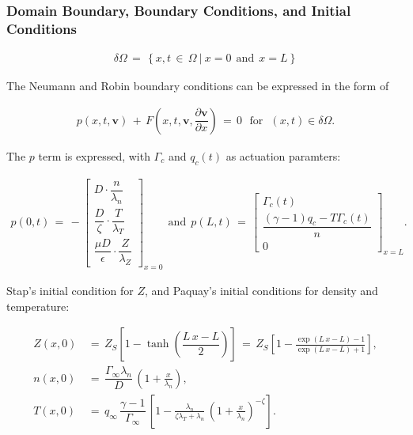 \documentclass[a4paper,10pt]{article}
\begin{document}
\subsubsection{Domain Boundary, Boundary Conditions, and Initial
Conditions}\label{domain-boundary-boundary-conditions-and-initial-conditions}

\begin{align}
    \delta \Omega \,=\, \left\{x, t \,\in\, \Omega ~|~ x = 0 ~~\text{and}~~ x = L\right\}
\end{align}

The Neumann and Robin boundary conditions can be expressed in the form
of

\begin{align}
    p\left(x, t, \mathbf{v}\right) \,+\, F\left(x, t, \mathbf{v}, \dfrac{\partial\mathbf{v}}{\partial x}\right) \,=\, 0 ~~~ \text{for} ~~~ (x, t) \in \delta\Omega.
\end{align}

The \(p\) term is expressed, with \(\Gamma_c\) and \(q_c(t)\) as
actuation paramters:

\begin{align}
p(0, t) \,=\, -\begin{bmatrix}
                D \cdot \dfrac{n}{\lambda_n}\\[2ex]
                \dfrac{D}{\zeta} \cdot \dfrac{T}{\lambda_T} \\[2ex]
                \dfrac{\mu D}{\epsilon} \cdot \dfrac{Z}{\lambda_Z}
                \end{bmatrix}_{x = 0}
~~ \text{and} ~~
p(L, t) \,=\, \begin{bmatrix}
                \Gamma_c(t) \\[1ex]
                \dfrac{(\gamma - 1) q_c - T\Gamma_c(t)}{n} \\[2ex]
                0
                \end{bmatrix}_{x = L}.
\end{align}

Stap's initial condition for \(Z\), and Paquay's initial conditions for
density and temperature:

\begin{align}
    Z(x,0) \,&=\, Z_S\left[1 - \tanh\left(\dfrac{L\,x - L}{2}\right)\right] \,=\, Z_S\left[1 - \frac{\exp(L\,x - L) - 1}{\exp(L\,x - L) + 1}\right], \\
    n(x,0) \,&=\, \dfrac{\Gamma_\infty \lambda_n}{D} \, \left(1 + \frac{x}{\lambda_n}\right), \\
    T(x,0) \,&=\, q_\infty \, \dfrac{\gamma - 1}{\Gamma_\infty} \, \left[1 - \frac{\lambda_n}{\zeta \lambda_T + \lambda_n} \, \left(1 + \frac{x}{\lambda_n}\right)^{-\zeta}\right].
\end{align}
\end{document}

